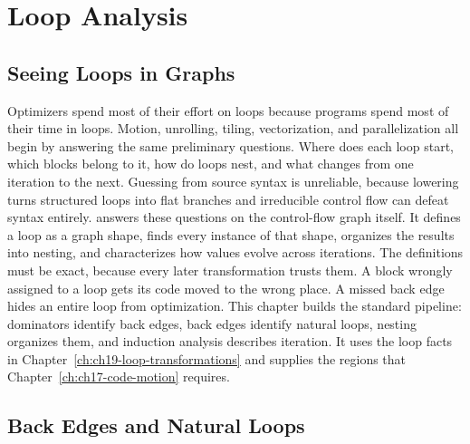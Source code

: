 \chapter{Loop Analysis}
\label{ch:ch18-loop-analysis}

\section{Seeing Loops in Graphs}
\label{sec:ch18-seeing-loops}

Optimizers spend most of their effort on loops because programs spend most of their time in loops.
Motion, unrolling, tiling, vectorization, and parallelization all begin by answering the same preliminary questions.
Where does each loop start, which blocks belong to it, how do loops nest, and what changes from one iteration to the next.
Guessing from source syntax is unreliable, because lowering turns structured loops into flat branches and irreducible control flow can defeat syntax entirely.
 answers these questions on the control-flow graph itself.
It defines a loop as a graph shape, finds every instance of that shape, organizes the results into nesting, and characterizes how values evolve across iterations.
The definitions must be exact, because every later transformation trusts them.
A block wrongly assigned to a loop gets its code moved to the wrong place.
A missed back edge hides an entire loop from optimization.
This chapter builds the standard pipeline: dominators identify back edges, back edges identify natural loops, nesting organizes them, and induction analysis describes iteration.
It uses the loop facts in Chapter~\ref{ch:ch19-loop-transformations} and supplies the regions that Chapter~\ref{ch:ch17-code-motion} requires.

\section{Back Edges and Natural Loops}
\label{sec:ch18-back-edges}

